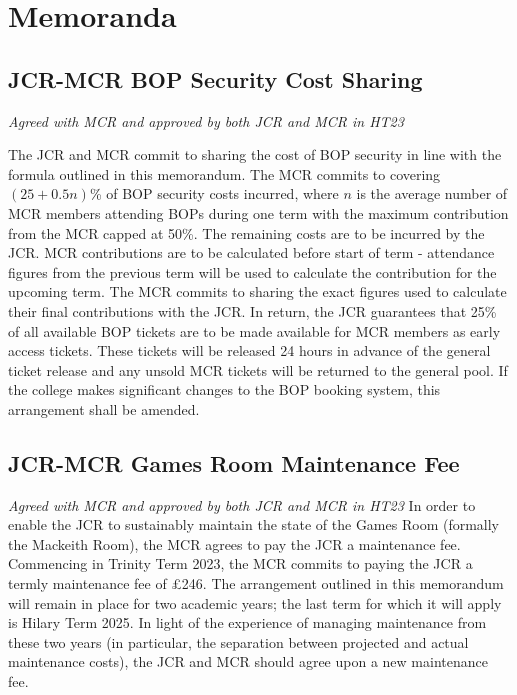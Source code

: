 \chapter{Memoranda}
\section{JCR-MCR BOP Security Cost Sharing}
\textit{Agreed with MCR and approved by both JCR and MCR in HT23}

\appnpara The JCR and MCR commit to sharing the cost of BOP security in line with the formula outlined in this memorandum. 
\appnpara The MCR commits to covering $(25+0.5n)$\% of BOP security costs incurred, where $n$ is the average number of MCR members attending BOPs during one term with the maximum contribution from the MCR capped at 50\%. The remaining costs are to be incurred by the JCR.
\appnpara MCR contributions are to be calculated before start of term - attendance figures from the previous term will be used to calculate the contribution for the upcoming term. The MCR commits to sharing the exact figures used to calculate their final contributions with the JCR.
\appnpara In return, the JCR guarantees that 25\% of all available BOP tickets are to be made available for MCR members as early access tickets. These tickets will be released 24 hours in advance of the general ticket release and any unsold MCR tickets will be returned to the general pool. 
\appnpara If the college makes significant changes to the BOP booking system, this arrangement shall be amended. 

\section {JCR-MCR Games Room Maintenance Fee}
\textit{Agreed with MCR and approved by both JCR and MCR in HT23}
\appnpara In order to enable the JCR to sustainably maintain the state of the Games Room (formally the Mackeith Room), the MCR agrees to pay the JCR a maintenance fee.
\appnpara Commencing in Trinity Term 2023, the MCR commits to paying the JCR a termly maintenance fee of £246. 
\appnpara The arrangement outlined in this memorandum will remain in place for two academic years; the last term for which it will apply is Hilary Term 2025. In light of the experience of managing maintenance from these two years (in particular, the separation between projected and actual maintenance costs), the JCR and MCR should agree upon a new maintenance fee. 
